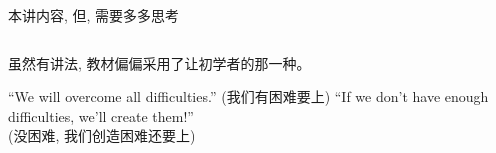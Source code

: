 
\begin{frame}{}
  \begin{center}
  \end{center}
  \begin{columns}
      \pause
  \end{columns}
\end{frame}

\begin{frame}{}
  \begin{center}
    \begin{center}
      本讲内容, 但, 需要多多思考
    \end{center}
  \end{center}
\end{frame}

\begin{frame}{}
  \begin{columns}
  \end{columns}
  \begin{center}
    虽然有讲法, 教材偏偏采用了让初学者的那一种。
  \end{center}
\end{frame}

\begin{frame}{}
  \begin{center}
    ``We will overcome all difficulties.'' (我们有困难要上)
    ``If we don't have enough difficulties, we'll create them!'' \\
    (没困难, 我们创造困难还要上)
  \end{center}
\end{frame}

\begin{frame}{}
  \begin{center}

    \pause
    \vspace{1.00cm}
  \end{center}
\end{frame}
